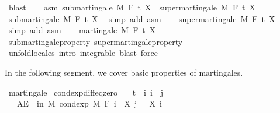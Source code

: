 \begin{isabellebody}
\ blast\isanewline
{}\isamarkupfalse%
\isanewline
\ \ \isamarkupfalse%
\ asm{\isacharcolon}{\kern0pt}\ {\isachardoublequoteopen}submartingale\ M\ F\ t\ X\ {\isasymand}\ supermartingale\ M\ F\ t\ X{\isachardoublequoteclose}\isanewline
\ \ \isamarkupfalse%
\ submartingale\ M\ F\ t\ X\ \isamarkupfalse%
\ {\isacharparenleft}{\kern0pt}simp\ add{\isacharcolon}{\kern0pt}\ asm{\isacharparenright}{\kern0pt}\isanewline
\ \ \isamarkupfalse%
\ supermartingale\ M\ F\ t\ X\ \isamarkupfalse%
\ {\isacharparenleft}{\kern0pt}simp\ add{\isacharcolon}{\kern0pt}\ asm{\isacharparenright}{\kern0pt}\isanewline
\ \ \isamarkupfalse%
\ {\isachardoublequoteopen}martingale\ M\ F\ t\ X{\isachardoublequoteclose}\ \isamarkupfalse%
\ submartingale{\isacharunderscore}{\kern0pt}property\ supermartingale{\isacharunderscore}{\kern0pt}property\ \isamarkupfalse%
\ {\isacharparenleft}{\kern0pt}unfold{\isacharunderscore}{\kern0pt}locales{\isacharparenright}{\kern0pt}\ {\isacharparenleft}{\kern0pt}intro\ integrable{\isacharcomma}{\kern0pt}\ blast{\isacharcomma}{\kern0pt}\ force{\isacharparenright}{\kern0pt}\isanewline
{}\isamarkupfalse%
%
\endisatagproof
{\isafoldproof}%
%
\isadelimproof
%
\endisadelimproof
%
\isadelimdocument
%
\endisadelimdocument
%
\isatagdocument
%
\isamarkuptrue%
%
\endisatagdocument
{\isafolddocument}%
%
\isadelimdocument
%
\endisadelimdocument
%
\begin{isamarkuptext}%
In the following segment, we cover basic properties of martingales.%
\end{isamarkuptext}\isamarkuptrue%
\isamarkupfalse%
\ martingale\isanewline
{}\isanewline
\isanewline
{}\isamarkupfalse%
\ cond{\isacharunderscore}{\kern0pt}exp{\isacharunderscore}{\kern0pt}diff{\isacharunderscore}{\kern0pt}eq{\isacharunderscore}{\kern0pt}zero{\isacharcolon}{\kern0pt}\isanewline
\ \ \ {\isachardoublequoteopen}t\ {\isasymle}\ i{\isachardoublequoteclose}\ {\isachardoublequoteopen}i\ {\isasymle}\ j{\isachardoublequoteclose}\isanewline
\ \ \ {\isachardoublequoteopen}AE\ {\isasymxi}\ in\ M{\isachardot}{\kern0pt}\ cond{\isacharunderscore}{\kern0pt}exp\ M\ {\isacharparenleft}{\kern0pt}F\ i{\isacharparenright}{\kern0pt}\ {\isacharparenleft}{\kern0pt}{\isasymlambda}{\isasymxi}{\isachardot}{\kern0pt}\ X\ j\ {\isasymxi}\ {\isacharminus}{\kern0pt}\ X\ i\ {\isasymxi}{\isacharparenright}{\kern0pt}\ {\isasymxi}\ {\isacharequal}{\kern0pt}\ {}{\isachardoublequoteclose}\isanewline

\end{isabellebody}
